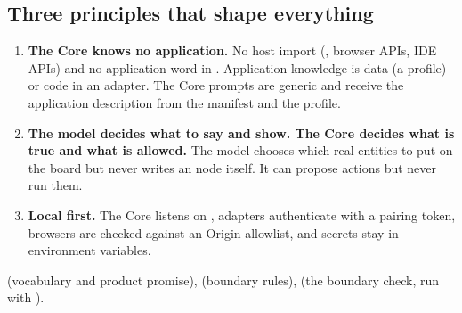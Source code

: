 \subsection{Three principles that shape everything}

\begin{enumerate}[leftmargin=1.4em]
  \item \textbf{The Core knows no application.} No host import (, browser APIs, IDE APIs) and no application word in . Application knowledge is data (a profile) or code in an adapter. The Core prompts are generic and receive the application description from the manifest and the profile.
  \item \textbf{The model decides what to say and show. The Core decides what is true and what is allowed.} The model chooses which real entities to put on the board but never writes an \pobs{} node itself. It can propose actions but never run them.
  \item \textbf{Local first.} The Core listens on , adapters authenticate with a pairing token, browsers are checked against an Origin allowlist, and secrets stay in environment variables.
\end{enumerate}

\begin{wherebox}
 (vocabulary and product promise),  (boundary rules),  (the boundary check, run with ).
\end{wherebox}


